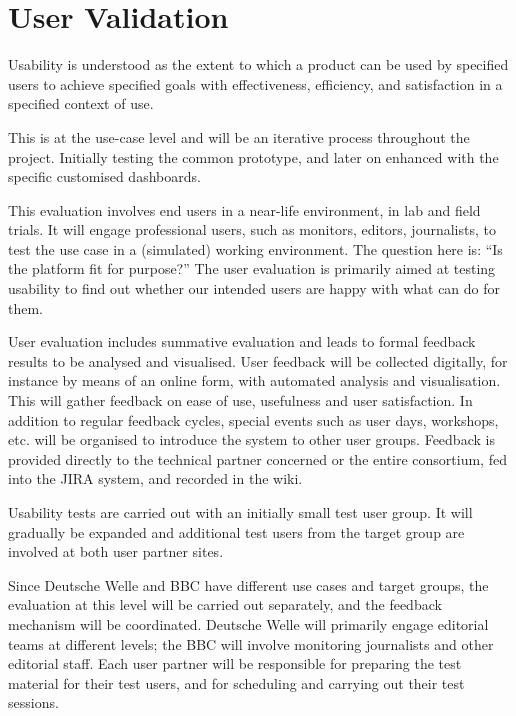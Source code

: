 \section{User Validation}

Usability is understood as the extent to which a product can be used by specified users to achieve specified goals with effectiveness, efficiency, and satisfaction in a specified context of use. 

This is at the use-case level and will be an iterative process throughout the project. Initially testing the common prototype, and later on enhanced with the specific customised dashboards. 

This evaluation involves end users in a near-life environment, in lab and field trials. It will engage professional users, such as monitors, editors, journalists, to test the use case in a (simulated) working environment. The question here is: ``Is the \SUMMA platform fit for purpose?''  The user evaluation is primarily aimed at testing usability to find out whether our intended users are happy with what \SUMMA can do for them. 

User evaluation includes summative evaluation and leads to formal feedback results to be analysed and visualised. User feedback will be collected digitally, for instance by means of an online form, with automated analysis and visualisation. This will gather feedback on ease of use, usefulness and user satisfaction. In addition to regular feedback cycles, special events such as user days, workshops, etc. will be organised to introduce the system to other user groups. Feedback is provided directly to the technical partner concerned or the entire consortium, fed into the JIRA system, and recorded in the wiki.

Usability tests are carried out with an initially small test user group. It will gradually be expanded and additional test users from the target group are involved at both user partner sites.

Since Deutsche Welle and BBC have different use cases and target groups, the evaluation at this level will be carried out separately, and the feedback mechanism will be coordinated. Deutsche Welle will primarily engage editorial teams at different levels; the BBC will involve monitoring journalists and other editorial staff. Each user partner will be responsible for preparing the test material for their test users, and for scheduling and carrying out their test sessions.

